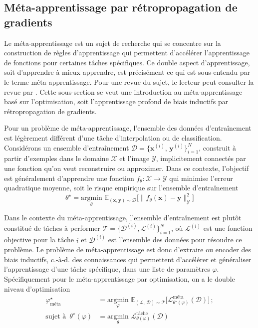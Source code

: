 \subsection{Méta-apprentissage par rétropropagation de gradients}
%
Le méta-apprentissage est un sujet de recherche qui se concentre sur la construction de règles d'apprentissage qui permettent 
d'accélérer l'apprentissage de fonctions pour certaines tâches spécifiques. Ce double aspect d'apprentissage, soit d'apprendre à mieux 
apprendre, est précisément ce qui est sous-entendu par le terme méta-apprentissage. Pour une revue du sujet, le lecteur peut consulter 
la revue par \citet{Hospedales2020}. Cette sous-section se veut une introduction au méta-apprentissage basé sur l'optimisation,
soit l'apprentissage profond de biais inductifs par rétropropagation de gradients.

Pour un problème de méta-apprentissage, l'ensemble des données d'entraînement est légèrement différent d'une tâche d'interpolation ou de classification. 
Considérons un ensemble d'entraînement $\mathcal{D} = \{\mathbf{x}^{(i)},\,\mathbf{y}^{(i)}\}_{i=1}^{N}$, 
construit à partir d'exemples dans le domaine $\mathcal{X}$ et l'image $\mathcal{Y}$, implicitement connectés par une fonction qu'on veut reconstruire ou 
approximer. Dans ce contexte, l'objectif est généralement d'apprendre une fonction $f_\theta: \mathcal{X} \rightarrow \mathcal{Y}$ 
qui minimise l'erreur quadratique moyenne, soit le risque empirique sur l'ensemble d'entraînement
\begin{equation}\label{eq:Regression}
        \theta^{\star} = \underset{\theta}{\mathrm{argmin}}\,\, 
        \mathbb{E}_{(\mathbf{x},\mathbf{y}) \sim \mathcal{D}} \bigg[ \big\lVert f_\theta(\mathbf{x}) - \mathbf{y} \big\rVert^{2}_{\mathcal{Y}}  \bigg]
\end{equation} 

Dans le contexte du méta-apprentissage, 
l'ensemble d'entraînement est plutôt constitué de tâches à performer $\mathcal{T} = \{\mathcal{D}^{(i)}, \mathcal{L}^{(i)}\}_{i=1}^{N}$, où 
$\mathcal{L}^{(i)}$ est une fonction objective pour la tâche $i$ et $\mathcal{D}^{(i)}$ 
est l'ensemble des données pour résoudre ce problème. 
Le problème de méta-apprentissage est donc d'extraire ou encoder des biais inductifs, c.-à-d. des connaissances qui permettent d'accélérer 
et généraliser l'apprentissage d'une tâche spécifique, dans une liste de paramètres $\varphi$. Spécifiquement 
pour le méta-apprentissage par optimisation, on a le double niveau d'optimisation
\begin{equation}\label{eq:meta learning}
        \begin{aligned}
                \varphi^{\star}_{\text{méta}} &= \underset{\varphi}{\mathrm{argmin}}\,\, 
                \mathbb{E}_{(\mathcal{L},\,\mathcal{D}) \sim \mathcal{T}} \bigg[ \mathcal{L}^{\text{méta}}_{\theta^{\star}(\varphi)}(\mathcal{D}) \bigg]\, ; \\[1.5ex]
                \text{sujet à}\,\,\, \theta^{\star }(\varphi) &= \underset{\theta}{\mathrm{argmin}}\,\, \mathcal{L}^{\text{tâche}}_{\theta(\varphi)}(\mathcal{D})
        \end{aligned}
\end{equation} 

